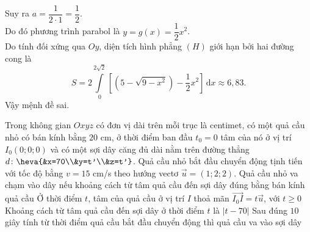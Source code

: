 \begin{ex}
{\begin{itemchoice}
			Suy ra $a = \dfrac{1}{2\cdot 1} = \dfrac{1}{2}$.\\
			Do đó phương trình parabol là $y = g(x) = \dfrac{1}{2}x^2$.\\
			Do tính đối xứng qua $Oy$, diện tích hình phẳng $(H)$ giới hạn bởi hai đường cong là
			\[S = 2 \displaystyle\int\limits_0^{2\sqrt{2}} \left[ \left(5 - \sqrt{9-x^2}\right) - \dfrac{1}{2}x^2 \right] \mathrm{\,d}x \approx 6{,}83.\]
			Vậy mệnh đề sai.
		\end{itemchoice}
	}
\end{ex}

\begin{ex}%
	Trong không gian $Oxyz$ có đơn vị dài trên mỗi trục là centimet, có một quả cầu nhỏ có bán kính bằng $20$ cm, ở thời điểm ban đầu $t_0=0$ tâm của nó ở vị trí $I_0(0;0;0)$ và có một sợi dây căng đủ dài nằm trên đường thẳng $d\colon\heva{&x=70\\&y=t'\\&z=t'}$. Quả cầu nhỏ bắt đầu chuyển động tịnh tiến với tốc độ bằng $v=15$ cm/s theo hướng vectơ $\overrightarrow{u}=(1;2;2)$.
	\choiceTF
	{\True Quả cầu nhỏ va chạm vào dây nếu khoảng cách từ tâm quả cầu đến sợi dây đúng bằng bán kính quả cầu}
	{Ở thời điểm $t$, tâm của quả cầu ở vị trí $I$ thoả mãn $\overrightarrow{I_0I}=t\overrightarrow{u}$, với $t\ge 0$}
	{Khoảng cách từ tâm quả cầu đến sợi dây ở thời điểm $t$ là $|t-70|$}
	{\True Sau đúng $10$ giây tính từ thời điểm quả cầu bắt đầu chuyển động thì quả cầu va vào sợi dây}
\end{ex}
